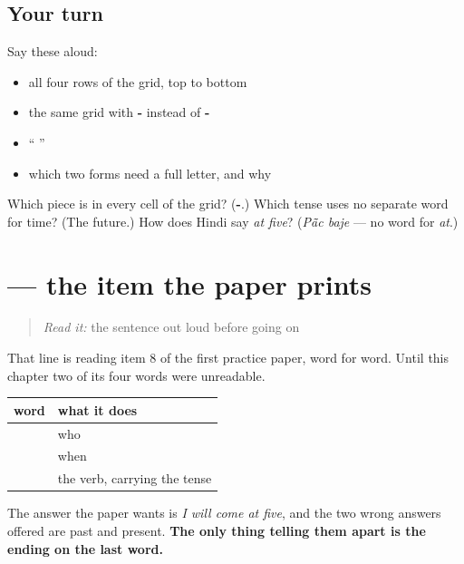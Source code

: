 \subsection*{Your turn}
Say these aloud:

\begin{itemize}
\raggedright
  \item all four rows of the grid, top to bottom
  \item the same grid with \textbf{-} instead of \textbf{-}
  \item \textquotedblleft{}   \textquotedblright{}
  \item which two forms need a full letter, and why
\end{itemize}

\begin{tcolorbox}[breakable,colback=teal!4,colframe=teal!35!black,title={Before you move on}]
Which piece is in every cell of the grid? (\textbf{-}.) Which tense uses no separate word for time? (The future.) How does Hindi say \emph{at five}? (\emph{Pā̃c baje} — no word for \emph{at}.)
\end{tcolorbox}
\section[\texorpdfstring{\hi{मैं} \hi{पाँच} \hi{बजे} \hi{आऊँगा} (maiṁ pā̃c baje āūṅgā)}{मैं पाँच बजे आऊँगा (maiṁ pā̃c baje āūṅgā)}]{    — the item the paper prints}

\label{lesson:HI-C88-sintesis-bhavishya}



\begin{quote}
\emph{Read it:} the sentence out loud before going on

\begin{quote}
   
\end{quote}
\end{quote}

\begin{grammarlens}[title={Grammar Lens: four words, four things you were taught}]
That line is reading item 8 of the first practice paper, word for word. Until this chapter two of its four words were unreadable.

\noindent
\begin{tabularx}{\linewidth}{@{}>{\raggedright\arraybackslash}X>{\raggedright\arraybackslash}X@{}}
\toprule
\textbf{word} & \textbf{what it does} \\
\midrule
\hi{मैं} & who \\
\hi{पाँच} \hi{बजे} & when \\
\hi{आऊँगा} & the verb, carrying the tense \\
\bottomrule
\end{tabularx}

The answer the paper wants is \emph{I will come at five}, and the two wrong answers offered are past and present. \textbf{The only thing telling them apart is the ending on the last word.}
\end{grammarlens}


